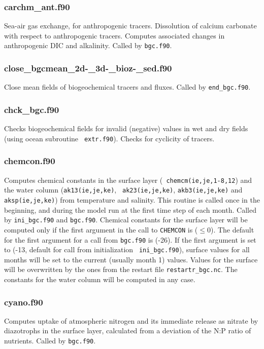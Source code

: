 \documentclass[11pt,a4paper,fleqn,twoside]{article}
\begin{document}
\subsubsection{carchm\_ant.f90}  Sea-air
gas exchange, for anthropogenic tracers. Dissolution of calcium carbonate with
respect to anthropogenic tracers. Computes associated changes in anthropogenic
DIC and alkalinity. Called by {\tt bgc.f90}.

\subsubsection{close\_bgcmean\_2d-\_3d-\_bioz-\_sed.f90} Close mean fields of
biogeochemical tracers and fluxes. Called by {\tt end\_bgc.f90}.

\subsubsection{chck\_bgc.f90} Checks biogeochemical fields for invalid
(negative) values in wet and dry fields (using ocean subroutine {\tt
extr.f90}). Checks for cyclicity of tracers. 

\subsubsection{chemcon.f90} Computes chemical constants in the surface layer ({\tt
chemcm(ie,je,1-8,12}) and the water column ({\tt ak13(ie,je,ke)}, {\tt
ak23(ie,je,ke)}, {\tt akb3(ie,je,ke)} and {\tt aksp(ie,je,ke)}) from
temperature and salinity. This routine is called once in the beginning, and
during the model run at the first time step of each month. Called by {\tt ini\_bgc.f90}
and {\tt bgc.f90}. 
Chemical constants for the surface layer will be computed only if the
first argument in the call to {\tt CHEMCON} is ($\le 0$). The default for the first
argument for a call from {\tt bgc.f90} is (-26). If the 
first argument is set to (-13, default for call from initialization {\tt
ini\_bgc.f90}), surface values for all months will be set to the current
(usually month 1) values. Values for the surface will be overwritten by the ones
from the restart file {\tt restartr\_bgc.nc}. The constants for the water column
will be computed in any case. 

\subsubsection{cyano.f90} Computes uptake of atmospheric nitrogen and its
immediate release as nitrate by diazotrophs in the surface layer, calculated
from a deviation of the N:P ratio of nutrients. Called by {\tt bgc.f90}.
\end{document}
